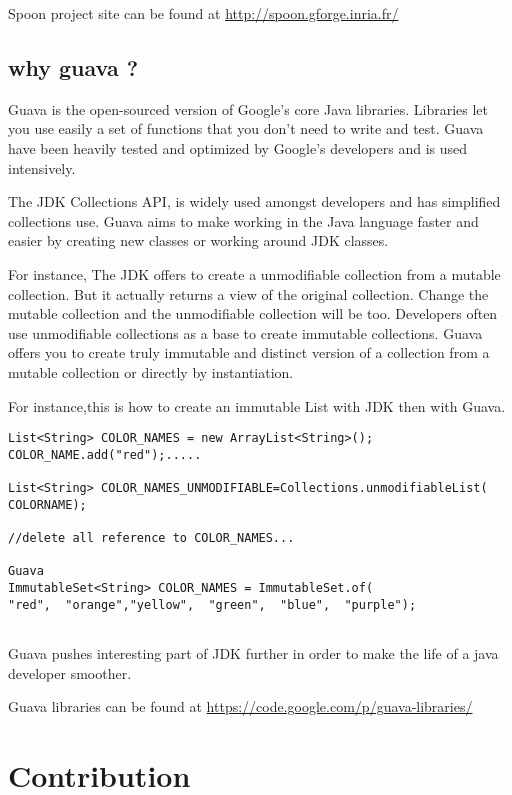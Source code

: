 \documentclass[paper=a4, fontsize=11pt]{scrartcl}
\numberwithin{equation}{section}%
\numberwithin{figure}{section}%
\numberwithin{table}{section}%
\begin{document}
\newline
Spoon project site can be found at \url{http://spoon.gforge.inria.fr/}

\subsection{why guava ?}

Guava is the open-sourced version of Google's core Java libraries.
Libraries let you use easily a set of functions that you don't need to
write and test. 
Guava have been heavily tested and optimized by Google's developers
and is used intensively.\newline

The JDK Collections API, is widely used amongst developers and has
simplified collections use. 
Guava aims to make working in the Java language faster and easier by
creating new classes or working around JDK classes.\newline

For instance, The JDK offers to create a unmodifiable collection from
a mutable collection. But it actually returns a view of the original
collection. Change the mutable collection and the unmodifiable
collection will be too. Developers often use unmodifiable collections
as a base to create immutable collections. Guava offers you to create
truly immutable and distinct version of a collection from a mutable
collection or directly by instantiation.\newline


For instance,this is how to create an immutable List with JDK then with Guava.
\begin{verbatim}
List<String> COLOR_NAMES = new ArrayList<String>();
COLOR_NAME.add("red");.....

List<String> COLOR_NAMES_UNMODIFIABLE=Collections.unmodifiableList(
COLORNAME);

//delete all reference to COLOR_NAMES...

Guava
ImmutableSet<String> COLOR_NAMES = ImmutableSet.of(  
"red",  "orange","yellow",  "green",  "blue",  "purple");


\end{verbatim}

Guava pushes interesting part of JDK further in order to make the life
of a java developer smoother.\newline

Guava libraries can be found at \url{https://code.google.com/p/guava-libraries/}

\section{Contribution}
\end{document}
